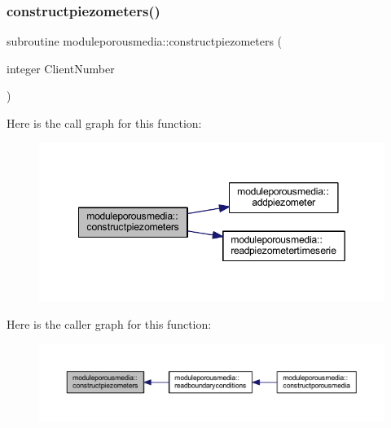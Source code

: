 \subsubsection{\texorpdfstring{constructpiezometers()}{constructpiezometers()}}
{\footnotesize\ttfamily subroutine moduleporousmedia\+::constructpiezometers (\begin{DoxyParamCaption}\item[{integer}]{Client\+Number }\end{DoxyParamCaption})\hspace{0.3cm}{\ttfamily [private]}}

Here is the call graph for this function\+:\nopagebreak
\begin{figure}[H]
\begin{center}
\leavevmode
\includegraphics[width=349pt]{namespacemoduleporousmedia_ac3173bc46df00d4f9eeea325d87cd8d7_cgraph}
\end{center}
\end{figure}
Here is the caller graph for this function\+:\nopagebreak
\begin{figure}[H]
\begin{center}
\leavevmode
\includegraphics[width=350pt]{namespacemoduleporousmedia_ac3173bc46df00d4f9eeea325d87cd8d7_icgraph}
\end{center}
\end{figure}
\mbox{\label{namespacemoduleporousmedia_ac5974f908fab2510640dceca6afdc55e}} 
